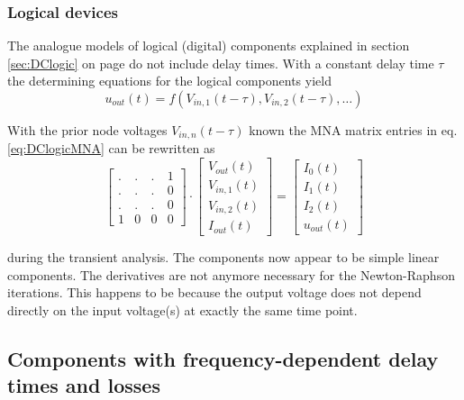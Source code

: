 \subsubsection{Logical devices}

The analogue models of logical (digital) components explained in
section \ref{sec:DClogic} on page \pageref{sec:DClogic} do not include
delay times.  With a constant delay time $\tau$ the determining
equations for the logical components yield
\begin{equation}
u_{out}\left(t\right) = f\left(V_{in,1}\left(t - \tau\right), V_{in,2}\left(t - \tau\right), \ldots\right)
\end{equation}

With the prior node voltages $V_{in,n}\left(t - \tau\right)$ known the
MNA matrix entries in eq. \eqref{eq:DClogicMNA} can be rewritten as
\begin{equation}
\begin{bmatrix}
.&.&.& 1\\
.&.&.& 0\\
.&.&.& 0\\
1 & 0 & 0 & 0
\end{bmatrix}
\cdot
\begin{bmatrix}
V_{out}\left(t\right)\\
V_{in,1}\left(t\right)\\
V_{in,2}\left(t\right)\\
I_{out}\left(t\right)
\end{bmatrix}
=
\begin{bmatrix}
I_{0}\left(t\right)\\
I_{1}\left(t\right)\\
I_{2}\left(t\right)\\
u_{out}\left(t\right)
\end{bmatrix}
\end{equation}

during the transient analysis.  The components now appear to be simple
linear components.  The derivatives are not anymore necessary for the
Newton-Raphson iterations.  This happens to be because the output
voltage does not depend directly on the input voltage(s) at exactly
the same time point.

\subsection{Components with frequency-dependent delay times and losses}

